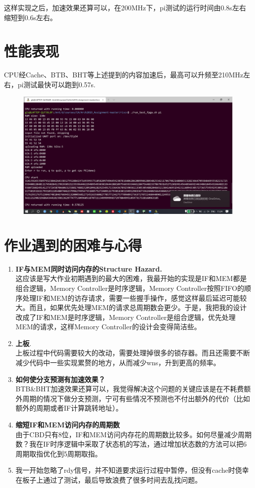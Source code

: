 \documentclass[a4paper,UTF8]{article}
\begin{document}
这样实现之后，加速效果还算可以，在200MHz下，pi测试的运行时间由0.8s左右缩短到0.6s左右。
\newpage
\section{性能表现}
CPU经Cache、BTB、BHT等上述提到的内容加速后，最高可以升频至210MHz左右，pi测试最快可以跑到0.57s.
\begin{figure}[h]
    \centering
	\includegraphics[width=1\linewidth]{5.png}
\end{figure}

\section{作业遇到的困难与心得}
\begin{enumerate}
    \item \textbf{IF与MEM同时访问内存的Structure Hazard.}\\
        这应该是写大作业初期遇到的最大的困难，我最开始的实现是IF和MEM都是组合逻辑，Memory Controller是时序逻辑，Memory Controller按照FIFO的顺序处理IF和MEM的访存请求，需要一些握手操作，感觉这样最后延迟可能较大。而且，如果优先处理MEM的请求总周期数会更少。于是，我把我的设计改成了IF和MEM是时序逻辑，Memory Controller是组合逻辑，优先处理MEM的请求，这样Memory Controller的设计会变得简洁些。
    \item \textbf{上板}.\\
    上板过程中代码需要较大的改动，需要处理掉很多的锁存器。而且还需要不断减少代码中一些实现累赘的地方，从而减少wns，升到更高的频率。
    \item \textbf{如何使分支预测有加速效果？}\\
    BTB\&BHT加速效果还算可以，我觉得解决这个问题的关键应该是在不耗费额外周期的情况下做分支预测，宁可有些情况不预测也不付出额外的代价（比如额外的周期或者IF计算跳转地址）。
    \item \textbf{缩短IF和MEM访问内存的周期数}\\
    由于CBD只有8位，IF和MEM访问内存花的周期数比较多。如何尽量减少周期数？我在IF时序逻辑中采取了状态机的写法，通过增加状态数的方法可以把6周期取指优化到5周期取指。
    \item 我一开始忽略了rdy信号，并不知道要求运行过程中暂停，但没有cache时侥幸在板子上通过了测试，最后导致浪费了很多时间去乱找问题。
\end{enumerate}
\end{document}
